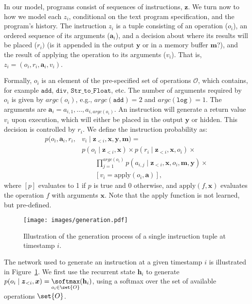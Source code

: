 In our model, programs consist of sequences of instructions, $\boldsymbol{z}$. We turn now to how we model each $z_i$, conditional on the text program specification, and the program's history. The instruction $z_i$ is a tuple consisting of an operation ($o_i$), an ordered sequence of its arguments ($\boldsymbol{a}_i$), and a decision about where its results will be placed ($r_i)$ (is it appended in the output $\boldsymbol{y}$ or in a memory buffer $\boldsymbol{m}$?), and the result of applying the operation to its arguments ($v_i$). That is, $z_i=(o_i,r_i,\boldsymbol{a}_{i},v_i)$. 

Formally, $o_i$ is an element of the pre-specified set of operations $\mathcal{O}$, which contains, for example $\texttt{add}$, $\texttt{div}$, $\texttt{Str\_to\_Float}$, etc. The number of arguments required by $o_i$ is given by $\textit{argc}(o_i)$, e.g., $\textit{argc}(\texttt{add})=2$ and $\textit{argc}(\texttt{log})=1$. The arguments are $\boldsymbol{a}_i = a_{i,1},\ldots,a_{i,\textit{argc}(o_i)}$. An instruction will generate a return value $v_i$ upon execution, which will either be placed in the output $\boldsymbol{y}$ or hidden. This decision is controlled by $r_i$. We define the instruction probability as:
\begin{align*}
p(o_i,\boldsymbol{a}_i, r_i, &v_i \mid \boldsymbol{z}_{<i}, \boldsymbol{x}, \boldsymbol{y}, \boldsymbol{m}) = \\
&p(o_i \mid \boldsymbol{z}_{<i},\boldsymbol{x}) \times p(r_i \mid \boldsymbol{z}_{<i},\boldsymbol{x},o_i) \times \\
& \qquad \prod_{j=1}^{\textit{argc}(o_i)} p(a_{i,j} \mid \boldsymbol{z}_{<i},\boldsymbol{x},o_i,\boldsymbol{m},\boldsymbol{y}) \times \\
&\qquad [v_i = \text{apply}(o_i,\boldsymbol{a})],
\end{align*}
where $[p]$ evaluates to 1 if $p$ is true and 0 otherwise, and $\text{apply}(f,\boldsymbol{x})$ evaluates the operation $f$ with arguments $\boldsymbol{x}$. Note that the apply function is not learned, but pre-defined.

\begin{figure}[t]
\centering
\texttt{[image: images/generation.pdf]}
    \vspace{-.4cm}\caption{Illustration of the generation process of a single instruction tuple at timestamp $i$.}
    \label{input_img}
\end{figure}

The network used to generate an instruction at a given timestamp $i$ is illustrated in Figure~\ref{input_img}. 
We first use the recurrent state $\mathbf{h}_i$ to generate $p(o_i\mid \boldsymbol{z}_{<i},\boldsymbol{x})=\underset{o_i \in \set{O}}\softmax(\mathbf{h}_i)$, using a softmax over the set of available operations $\set{O}$.

